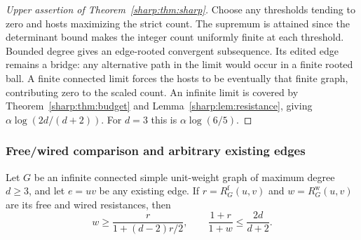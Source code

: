 \begin{proof}[Upper assertion of Theorem~\ref{sharp:thm:sharp}]
Choose any thresholds tending to zero and hosts maximizing the strict
count. The supremum is attained since the determinant bound makes the
integer count uniformly finite at each threshold. Bounded degree gives
an edge-rooted convergent subsequence. Its edited edge remains a bridge:
any alternative path in the limit would occur in a finite rooted ball.
A finite connected limit forces the hosts to be eventually that finite
graph, contributing zero to the scaled count. An infinite limit is
covered by Theorem~\ref{sharp:thm:budget} and Lemma~\ref{sharp:lem:resistance}, giving
$\alpha\log(2d/(d+2))$. For $d=3$ this is $\alpha\log(6/5)$.
\end{proof}

\subsubsection{Free/wired comparison and arbitrary existing edges}\label{sharp:sec:free-wired}
\begin{lemma}\label{sharp:lem:free-wired}
Let $G$ be an infinite connected simple unit-weight graph of maximum
degree $d\ge3$, and let $e=uv$ be any existing edge. If
$r=R^{\mathrm f}_G(u,v)$ and $w=R^{\mathrm w}_G(u,v)$ are its free
and wired resistances, then
\[
 w\ge\frac{r}{1+(d-2)r/2},\qquad
               \frac{1+r}{1+w}\le\frac{2d}{d+2}.
\]
\end{lemma}
